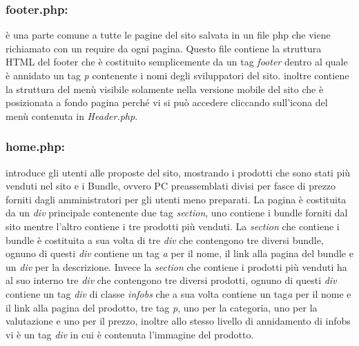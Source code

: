  \subsubsection{footer.php:} \Spazio è una parte comune a tutte le pagine del sito salvata in un file php che viene richiamato con un require da ogni pagina.
 Questo file contiene la struttura HTML del footer che è costituito semplicemente da un tag \emph{footer} dentro al quale è annidato un tag \emph{p} contenente i nomi degli sviluppatori del sito. 
 inoltre contiene la struttura del menù visibile solamente nella versione mobile del sito che è posizionata a fondo pagina perché vi si può accedere cliccando sull'icona del menù contenuta in \emph{Header.php}.
	
 \subsubsection{home.php:} \Spazio introduce gli utenti alle proposte del sito, mostrando i prodotti che sono stati più venduti nel sito e i Bundle, ovvero PC preassemblati divisi per fasce di prezzo forniti dagli amministratori per gli utenti meno preparati. \newline
 La pagina è costituita da un \emph{div} principale contenente due tag \emph{section}, uno contiene i bundle forniti dal sito mentre l'altro contiene i tre prodotti più venduti. \newline
 La \emph{section} che contiene i bundle è costituita a sua volta di tre \emph{div} che contengono tre diversi bundle, ognuno di questi \emph{div} contiene un tag \emph{a} per il nome, il link alla pagina del bundle e un \emph{div} per la descrizione.\newline
 Invece la \emph{section} che contiene i prodotti più venduti ha al suo interno tre \emph{div} che contengono tre diversi prodotti, ognuno di questi \emph{div} contiene un tag \emph{div} di classe \emph{infobs} che a sua volta contiene un tag\emph{a} per il nome e il link alla pagina del prodotto, tre tag \emph{p}, uno per la categoria, uno per la valutazione e uno per il prezzo, inoltre allo stesso livello di annidamento di infobs vi è un tag \emph{div} in cui è contenuta l'immagine del prodotto.
 
